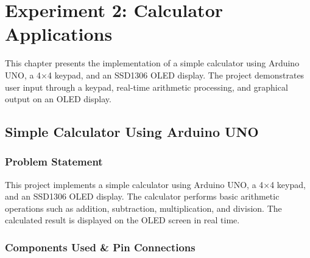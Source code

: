 
\chapter{Experiment 2: Calculator Applications}

This chapter presents the implementation of a simple calculator using Arduino UNO, a 4×4 keypad, and an SSD1306 OLED display. The project demonstrates user input through a keypad, real-time arithmetic processing, and graphical output on an OLED display.


\section{Simple Calculator Using Arduino UNO}



\subsection{Problem Statement}

This project implements a simple calculator using Arduino UNO, a 4×4 keypad, and an SSD1306 OLED display. The calculator performs basic arithmetic operations such as addition, subtraction, multiplication, and division. The calculated result is displayed on the OLED screen in real time.


\subsection{Components Used \& Pin Connections}

